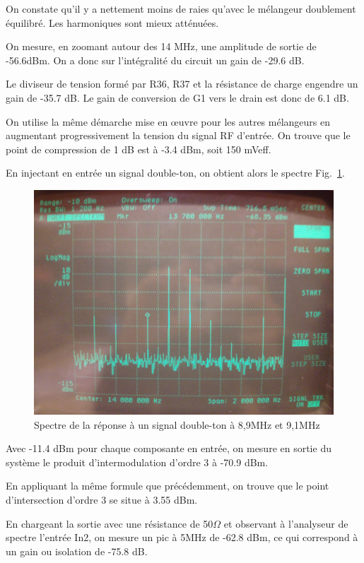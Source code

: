 \documentclass{article}
\begin{document}
On constate qu'il y a nettement moins de raies qu'avec le mélangeur doublement équilibré. Les harmoniques sont mieux atténuées.



On mesure, en zoomant autour des 14 MHz, une amplitude de sortie de -56.6dBm. On a donc sur l'intégralité du circuit un gain de -29.6 dB.

Le diviseur de tension formé par R36, R37 et la résistance de charge engendre un gain de -35.7 dB. Le gain de conversion de G1 vers le drain est donc de 6.1 dB.



On utilise la même démarche mise en œuvre pour les autres mélangeurs en augmentant progressivement la tension du signal RF d'entrée.
On trouve que le point de compression de 1 dB est à -3.4 dBm, soit 150 mVeff.



En injectant en entrée un signal double-ton, on obtient alors le spectre Fig.~\ref{fig:10_3_4}.

\begin{figure}[h!]
	\centering
	\includegraphics[width=.7\textwidth]{10_3_4}
	\caption{Spectre de la réponse à un signal double-ton à 8,9MHz et 9,1MHz}
	\label{fig:10_3_4}
\end{figure}

Avec -11.4 dBm pour chaque composante en entrée, on mesure en sortie du système le produit d'intermodulation d'ordre 3 à -70.9 dBm.

En appliquant la même formule que précédemment, on trouve que le point d'intersection d'ordre 3 se situe à 3.55 dBm.



En chargeant la sortie avec une résistance de 50$\Omega$ et observant à l'analyseur de spectre l'entrée In2, on mesure un pic à 5MHz de -62.8 dBm, ce qui correspond à un gain ou isolation de -75.8 dB.
\end{document}
